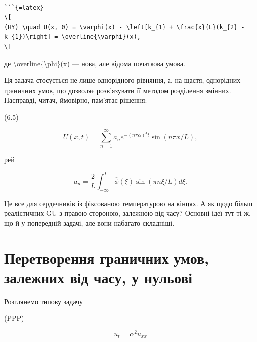 \documentclass[
]{article}
\begin{document}
\begin{verbatim}

```{=latex}
\[
(HY) \quad U(x, 0) = \varphi(x) - \left[k_{1} + \frac{x}{L}(k_{2} - k_{1})\right] = \overline{\varphi}(x),
\]
\end{verbatim}

де \textbackslash overline\{\textbackslash phi\}(x) --- нова, але відома
початкова умова.

Ця задача стосується не лише однорідного рівняння, а, на щастя,
однорідних граничних умов, що дозволяє розв'язувати її методом
розділення змінних. Насправді, читач, ймовірно, пам'ятає рішення:

(6.5)

\[
U(x, t) = \sum_{n=1}^{\infty} a_n e^{-(n\pi\alpha)^4 t} \sin(n\pi x/L),
\]

рей

\[
a_n = \frac{2}{L} \int_{-\infty}^{L} \overline{\phi}(\xi) \sin(\pi n\xi/L) d\xi.
\]

Це все для сердечників із фіксованою температурою на кінцях. А як щодо
більш реалістичних GU з правою стороною, залежною від часу? Основні ідеї
тут ті ж, що й у попередній задачі, але вони набагато складніші.

\section{Перетворення граничних умов, залежних від часу, у
нульові}\label{ux43fux435ux440ux435ux442ux432ux43eux440ux435ux43dux43dux44f-ux433ux440ux430ux43dux438ux447ux43dux438ux445-ux443ux43cux43eux432-ux437ux430ux43bux435ux436ux43dux438ux445-ux432ux456ux434-ux447ux430ux441ux443-ux443-ux43dux443ux43bux44cux43eux432ux456}

Розглянемо типову задачу

(PPP)

\[
u_t = \alpha^2 u_{xx}
\]
\end{document}
